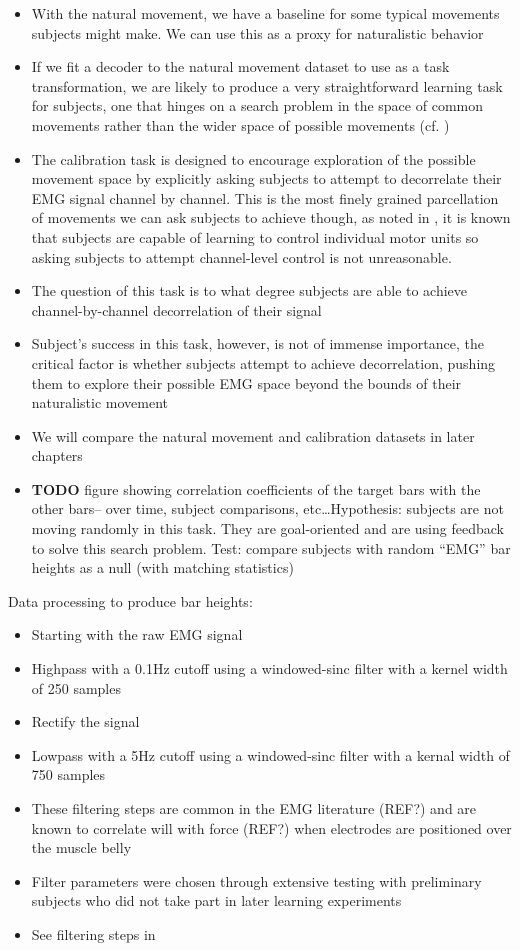 \documentclass[../main.tex]{subfiles}
\begin{document}
\begin{itemize}
  \item With the natural movement, we have a baseline for some typical movements subjects might make. We can use this as a proxy for naturalistic behavior
  \item If we fit a decoder to the natural movement dataset to use as a task transformation, we are likely to produce a very straightforward learning task for subjects, one that hinges on a search problem in the space of common movements rather than the wider space of possible movements (cf. )
  \item The calibration task is designed to encourage exploration of the possible movement space by explicitly asking subjects to attempt to decorrelate their EMG signal channel by channel. This is the most finely grained parcellation of movements we can ask subjects to achieve though, as noted in , it is known that subjects are capable of learning to control individual motor units so asking subjects to attempt channel-level control is not unreasonable.
  \item The question of this task is to what degree subjects are able to achieve channel-by-channel decorrelation of their signal
  \item Subject's success in this task, however, is not of immense importance, the critical factor is whether subjects attempt to achieve decorrelation, pushing them to explore their possible EMG space beyond the bounds of their naturalistic movement
  \item We will compare the natural movement and calibration datasets in later chapters
  \item \textbf{TODO} figure showing correlation coefficients of the target bars with the other bars-- over time, subject comparisons, etc\ldots Hypothesis: subjects are not moving randomly in this task. They are goal-oriented and are using feedback to solve this search problem. Test: compare subjects with random ``EMG'' bar heights as a null (with matching statistics)
\end{itemize}

Data processing to produce bar heights:

\begin{itemize}
  \item Starting with the raw EMG signal
  \item Highpass with a 0.1Hz cutoff using a windowed-sinc filter with a kernel width of 250 samples
  \item Rectify the signal
  \item Lowpass with a 5Hz cutoff using a windowed-sinc filter with a kernal width of 750 samples
  \item These filtering steps are common in the EMG literature (REF?) and are known to correlate will with force (REF?) when electrodes are positioned over the muscle belly
  \item Filter parameters were chosen through extensive testing with preliminary subjects who did not take part in later learning experiments
  \item See filtering steps in 
\end{itemize}
\end{document}
